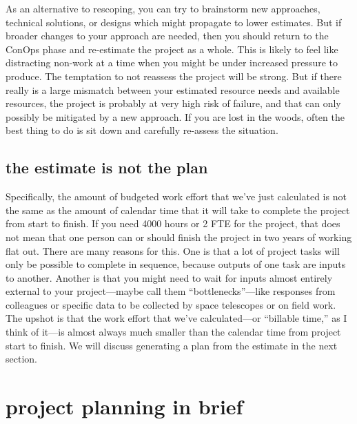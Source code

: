 \documentclass[12pt,oneside]{book}
\begin{document}
As an alternative to rescoping, you can try to brainstorm new approaches, technical solutions, or designs which might propagate to lower estimates. But if broader changes to your approach are needed, then you should return to the ConOps phase and re-estimate the project as a whole. This is likely to feel like distracting non-work at a time when you might be under increased pressure to produce. The temptation to not reassess the project will be strong. But if there really is a large mismatch between your estimated resource needs and available resources, the project is probably at very high risk of failure, and that can only possibly be mitigated by a new approach. If you are lost in the woods, often the best thing to do is sit down and carefully re-assess the situation.

\section*{the estimate is not the plan}

Specifically, the amount of budgeted work effort that we've just calculated is not the same as the amount of calendar time that it will take to complete the project from start to finish. If you need 4000 hours or 2 FTE for the project, that does not mean that one person can or should finish the project in two years of working flat out. There are many reasons for this. One is that a lot of project tasks will only be possible to complete in sequence, because outputs of one task are inputs to another. Another is that you might need to wait for inputs almost entirely external to your project---maybe call them ``bottlenecks''---like responses from colleagues or specific data to be collected by space telescopes or on field work. The upshot is that the work effort that we've calculated---or ``billable time,'' as I think of it---is almost always much smaller than the calendar time from project start to finish. We will discuss generating a plan from the estimate in the next section.

\newpage
{}
\chapter*{project planning in brief}
\end{document}
